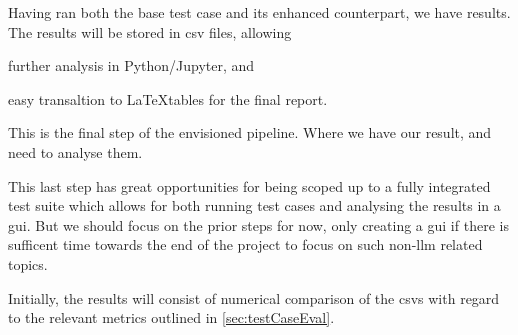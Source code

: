 Having ran both the base test case and its enhanced counterpart, we have
results. The results will be stored in \acrfull{csv} files, allowing \begin{inparaenum}
    \item further analysis in Python/Jupyter,
    and
    \item easy transaltion to \LaTeX tables for the final report.
\end{inparaenum}

This is the final step of the envisioned pipeline. Where we have our result, and
need to analyse them.

This last step has great opportunities for being scoped up to a fully integrated
test suite which allows for both running test cases and analysing the results in
a \acrfull{gui}. But we should focus on the prior steps for now, only creating a
\acrshort{gui} if there is sufficent time towards the end of the project to
focus on such non-\acrshort{llm} related topics.

Initially, the results will consist of numerical comparison of the
\acrshort{csv}s with regard to the relevant metrics outlined in
\cref{sec:testCaseEval}.
